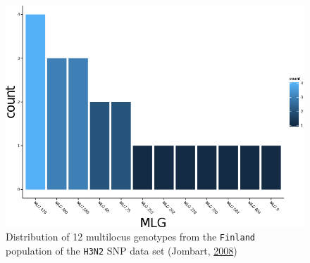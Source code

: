 \documentclass[double,12pt]{beavtex}
\begin{document}
  \begin{figure}
  
  {\centering \includegraphics[width=0.8\linewidth]{figure/poppr/Finland} 
  
  }
  
  \caption[Distribution of 12 multilocus genotypes from the \texttt{Finland}
  population of the \texttt{H3N2} SNP data set (Jombart,
  \protect\hyperlink{ref-Jombart:2008}{2008})]{Distribution of 12 multilocus genotypes from the \texttt{Finland}
  population of the \texttt{H3N2} SNP data set (Jombart,
  \protect\hyperlink{ref-Jombart:2008}{2008})}\label{fig:poppr1}
  \end{figure}
  
  \newpage
  
\end{document}
